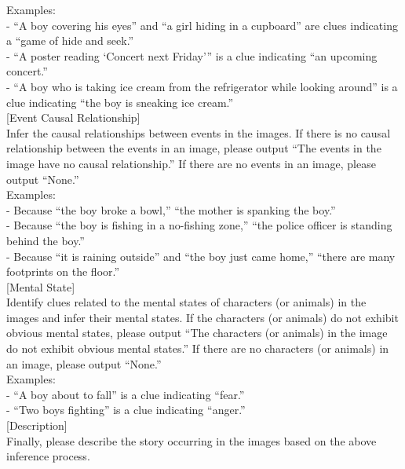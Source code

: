 \begin{figure*}[hbt!]
\begin{center}
\begin{tcolorbox}
            Examples:  \\
            - ``A boy covering his eyes'' and ``a girl hiding in a cupboard'' are clues indicating a ``game of hide and seek.''  \\
            - ``A poster reading `Concert next Friday''' is a clue indicating ``an upcoming concert.''  \\
            - ``A boy who is taking ice cream from the refrigerator while looking around'' is a clue indicating ``the boy is sneaking ice cream.''  \\
            
            [Event Causal Relationship]  \\
            Infer the causal relationships between events in the images. If there is no causal relationship between the events in an image, please output ``The events in the image have no causal relationship.'' If there are no events in an image, please output ``None.''  \\
            
            Examples:  \\
            - Because ``the boy broke a bowl,'' ``the mother is spanking the boy.''  \\
            - Because ``the boy is fishing in a no-fishing zone,'' ``the police officer is standing behind the boy.''  \\
            - Because ``it is raining outside'' and ``the boy just came home,'' ``there are many footprints on the floor.''  \\
            
            [Mental State]  \\
            Identify clues related to the mental states of characters (or animals) in the images and infer their mental states. If the characters (or animals) do not exhibit obvious mental states, please output ``The characters (or animals) in the image do not exhibit obvious mental states.'' If there are no characters (or animals) in an image, please output ``None.''  \\
            
            Examples:  \\
            - ``A boy about to fall'' is a clue indicating ``fear.''  \\
            - ``Two boys fighting'' is a clue indicating ``anger.''  \\
            
            
            [Description]  \\
            Finally, please describe the story occurring in the images based on the above inference process.  \\
            

\end{tcolorbox}
\end{center}
\end{figure*}
